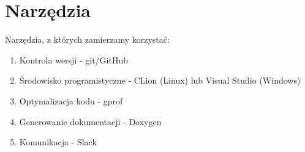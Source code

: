 \chapter{Narzędzia}
Narzędzia, z których zamierzamy korzystać:
\begin{enumerate}
\item Kontrola wersji - git/GitHub
\item Środowisko programistyczne - CLion (Linux) lub Visual Studio (Windows)
\item Optymalizacja kodu - gprof
\item Generowanie dokumentacji - Doxygen
\item Komunikacja - Slack
\end{enumerate}